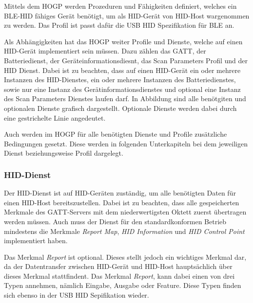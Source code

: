 Mittels dem \acl{HOGP} werden Prozeduren und Fähigkeiten definiert, welches ein \acs{BLE}-\acs{HID} fähiges Gerät benötigt, um als \acs{HID}-Gerät von \acs{HID}-Host wargenommen zu werden. Das Profil ist passt dafür die USB \acs{HID} Spezifikation für \ac{BLE} an. \cite[S.~9]{bluetoothHOGP}

Als Abhängigkeiten hat das \acf{HOGP} weiter Profile und Dienste, welche auf einen \acs{HID}-Gerät implementiert sein müssen. Dazu zählen das \acs{GATT}, der Batteriedienst, der Geräteinformationsdiesnt, das Scan Parameters Profil und der \acs{HID} Dienst. Dabei ist zu beachten, dass auf einen \acs{HID}-Gerät ein oder mehrere Instanzen des \acs{HID}-Dienstes, ein oder mehrere Instanzen des Batteriedienstes, sowie nur eine Instanz des Gerätinformationsdienstes und optional eine Instanz des Scan Parameters Dienstes laufen darf. \cite[S.~9, S.~11]{bluetoothHOGP} In Abbildung  sind alle benötgiten und optionalen Dienste grafisch dargestellt. Optionale Dienste werden dabei durch eine gestrichelte Linie angedeutet.


Auch werden im \acl{HOGP} für alle benötigten Dienste und Profile zusätzliche Bedingungen gesetzt. Diese werden in folgenden Unterkapiteln bei dem jeweiligen Dienst beziehungsweise Profil dargelegt.

\subsubsection{\ac{HID}-Dienst}

Der \acs{HID}-Dienst ist auf \acs{HID}-Geräten zuständig, um alle benötigten Daten für einen \acs{HID}-Host bereitszustellen. Dabei ist zu beachten, dass alle gespeicherten Merkmale des \acs{GATT}-Servers mit dem niederwertigsten Oktett zuerst übertragen werden müssen. Auch muss der Dienst für den standardkonformen Betrieb mindestens die Merkmale \textit{Report Map}, \textit{HID Information} und \textit{HID Control Point} implementiert haben. \cite[S.~8ff.]{bluetoothHIDS}

Das Merkmal \textit{Report} ist optional. Dieses stellt jedoch ein wichtiges Merkmal dar, da der Datentransfer zwischen \acs{HID}-Gerät und \acs{HID}-Host hauptsächlich über dieses Merkmal stattfindent. Das Merkmal \textit{Report}, kann dabei einen von drei Typen annehmen, nämlich Eingabe, Ausgabe oder Feature. Diese Typen finden sich ebenso in der USB \acs{HID} Sepifikation wieder. \cite[S.~11f.]{bluetoothHIDS}

